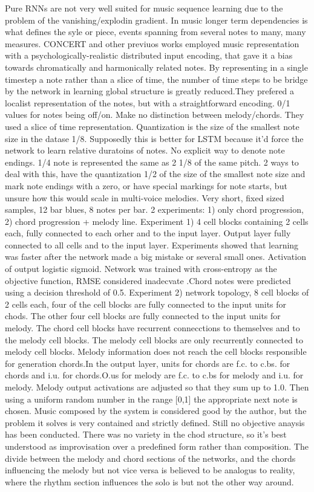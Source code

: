 \cite{Eck2002} Pure RNNs are not very well suited for music sequence learning due to the problem of the vanishing/explodin gradient. In music longer term dependencies is what defines the syle or piece, events spanning from several notes to many, many measures. CONCERT and other previuos works employed music representation with a psychologically-realistic distributed input encoding, that gave it a bias towards chromatically and harmonically related notes. By representing in a single timestep a note rather than a slice of time, the number of time steps to be bridge by the network in learning global structure is greatly reduced.They prefered a localist representation of the notes, but with a straightforward encoding. 0/1 values for notes being off/on. Make no distinction between melody/chords. They used a slice of time representation. Quantization is the size of the smallest note size in the datase 1/8. Supposedly this is better for LSTM because it'd force the network to learn relative duratoins of notes. No explicit way to denote note endings. 1/4 note is represented the same as 2 1/8 of the same pitch. 2 ways to deal with this, have the quantization 1/2 of the size of the smallest note size and mark note endings with a zero, or have special markings for note starts, but unsure how this would scale in multi-voice melodies. Very short, fixed sized samples, 12 bar blues, 8 notes per bar. 2 experiments: 1) only chord progression, 2) chord progression + melody line. Experiment 1) 4 cell blocks containing 2 cells each, fully connected to each orher and to the input layer. Output layer fully connected to all cells and to the input layer. Experiments showed that learning was faster after the network made a big mistake or several small ones. Activation of output logistic sigmoid. Network was trained with cross-entropy as the objective function, RMSE considered inadecvate .Chord notes were predicted using a decision threshold of 0.5. Experiment 2) network topology, 8 cell blocks of 2 cells each, four of the cell blocks are fully connected to the input units for chods. The other four cell blocks are fully connected to the input units for melody. The chord cell blocks have recurrent connecctions to themselves and to the melody cell blocks. The melody cell blocks are only recurrently connected to melody cell blocks. Melody information does not reach the cell blocks responsible for generation chords.In the output layer, units for chords are f.c. to c.bs. for chords and i.u. for chords.O.us for melody are f.c. to c.bs for melody and i.u. for melody. Melody output activations are adjusted so that they sum up to 1.0. Then using a uniform random number in the range [0,1] the appropriate next note is chosen. Music composed by the system is considered good by the author, but the problem it solves is very contained and strictly defined. Still no objective anaysis has been conducted. There was no variety in the chod structure, so it's best understood as improvisation over a predefined form rather than composition. The divide between the melody and chord sections of the networks, and the chords influencing the melody but not vice versa is believed to be analogus to reality, where the rhythm section influences the solo is but not the other way around.

